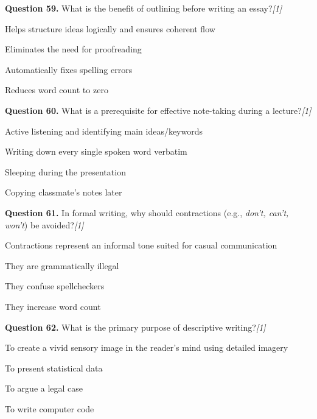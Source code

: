 \documentclass[11pt,a4paper]{article}
\newcommand{\pts}[1]{\hfill   \textit{[#1]}}
\begin{document}
\medskip




\noindent   \textbf{Question 59.} What is the benefit of outlining before writing an essay?\pts{1}

\begin{parts}
  \item Helps structure ideas logically and ensures coherent flow
  \item Eliminates the need for proofreading
  \item Automatically fixes spelling errors
  \item Reduces word count to zero
\end{parts}

\medskip




\noindent   \textbf{Question 60.} What is a prerequisite for effective note-taking during a lecture?\pts{1}

\begin{parts}
  \item Active listening and identifying main ideas/keywords
  \item Writing down every single spoken word verbatim
  \item Sleeping during the presentation
  \item Copying classmate's notes later
\end{parts}

\medskip




\noindent   \textbf{Question 61.} In formal writing, why should contractions (e.g.,   \textit{don't, can't, won't}) be avoided?\pts{1}

\begin{parts}
  \item Contractions represent an informal tone suited for casual communication
  \item They are grammatically illegal
  \item They confuse spellcheckers
  \item They increase word count
\end{parts}

\medskip




\noindent   \textbf{Question 62.} What is the primary purpose of descriptive writing?\pts{1}

\begin{parts}
  \item To create a vivid sensory image in the reader's mind using detailed imagery
  \item To present statistical data
  \item To argue a legal case
  \item To write computer code
\end{parts}
\end{document}
